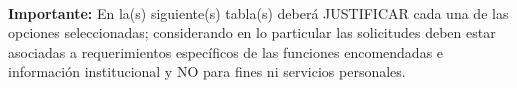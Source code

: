 \documentclass[letterpaper,9pt]{article}
\begin{document}
{\textbf{\\Importante:}} En la(s) siguiente(s) tabla(s) deberá JUSTIFICAR cada una de las opciones seleccionadas; considerando en lo particular las solicitudes deben estar asociadas a requerimientos específicos de las funciones encomendadas e información institucional y NO para fines ni servicios personales. 

\end{document}
